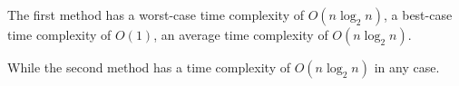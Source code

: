 \documentclass{article}
\begin{document}
The first method has a worst-case time complexity of \(O(n \log_2 n)\), a best-case time complexity of \(O(1)\), an average time complexity of \(O(n \log_2 n)\).

While the second method has a time complexity of \(O(n \log_2 n)\) in any case.
\end{document}
